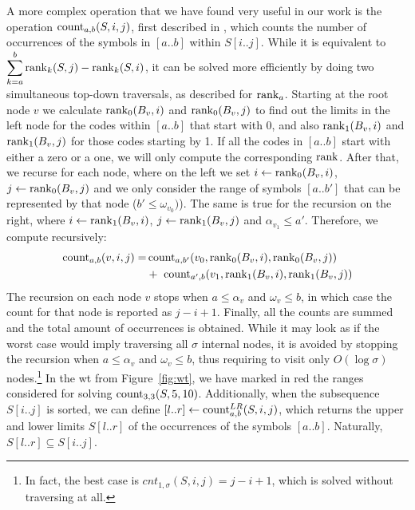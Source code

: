 \documentclass[a4paper,10pt,twoside]{book}
\begin{document}
    A more complex operation that we have found very useful in our work is the operation $\operatorname{count}_{a,b}(S,i,j)$, first described in \cite{gagie2012new}, which counts the number of occurrences of the symbols in $[a..b]$ within $S[i..j]$. While it is equivalent to $\displaystyle\sum^b_{k=a}\operatorname{rank}_k(S,j) - \operatorname{rank}_k(S,i)$, it can be solved more efficiently by doing two simultaneous top-down traversals, as described for $\operatorname{rank}_a$. Starting at the root node $v$ we calculate $\operatorname{rank}_0(B_v,i)$ and $\operatorname{rank}_0(B_v,j)$ to find out the limits in the left node for the codes within $[a..b]$ that start with 0, and also $\operatorname{rank}_1(B_v,i)$ and $\operatorname{rank}_1(B_v,j)$ for those codes starting by 1. If all the codes in $[a..b]$ start with either a zero or a one, we will only compute the corresponding $\operatorname{rank}$. After that, we recurse for each node, where on the left we set $i\leftarrow\operatorname{rank}_0(B_v,i)$, $j\leftarrow\operatorname{rank}_0(B_v,j)$ and we only consider the range of symbols $[a..b']$ that can be represented by that node ($b' \leq \omega_{v_0})$). The same is true for the recursion on the right, where $i\leftarrow\operatorname{rank}_1(B_v,i)$, $j\leftarrow\operatorname{rank}_1(B_v,j)$ and $\alpha_{v_1} \leq a'$. Therefore, we compute recursively:
    \begin{align*}
    \operatorname{count}_{a,b}(v,i,j) = &\operatorname{count}_{a,b'}(v_0,\operatorname{rank}_0(B_v,i),\operatorname{rank}_0(B_v,j))\\
    &+~\operatorname{count}_{a',b}(v_1,\operatorname{rank}_1(B_v,i),\operatorname{rank}_1(B_v,j))
    \end{align*}
    The recursion on each node $v$ stops when $a \leq \alpha_v$ and $\omega_v \leq b$, in which case the count for that node is reported as $j-i+1$. Finally, all the counts are summed and the total amount of occurrences is obtained. While it may look as if the worst case would imply traversing all $\sigma$ internal nodes, it is avoided by stopping the recursion when $a \leq \alpha_v$ and $\omega_v \leq b$, thus requiring to visit only $O(\log\sigma)$ nodes.\footnote{In fact, the best case is $cnt_{1,\sigma}(S,i,j) = j-i+1$, which is solved without traversing at all.} In the \gls{wt} from Figure~\ref{fig:wt}, we have marked in red the ranges considered for solving $\operatorname{count}_{3,3}(S,5,10)$. Additionally, when the subsequence $S[i..j]$ is sorted, we can define $[l..r]\leftarrow\operatorname{count}^{LR}_{a,b}(S,i,j)$, which returns the upper and lower limits $S[l..r]$ of the occurrences of the symbols $[a..b]$. Naturally, $S[l..r] \subseteq S[i..j]$.
    
\end{document}
